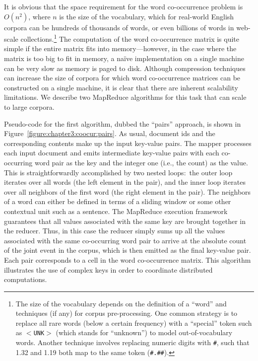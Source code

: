 It is obvious that the space requirement for the word co-occurrence
problem is $O(n^2)$, where $n$ is the size of the vocabulary, which
for real-world English corpora can be hundreds of thousands of words,
or even billions of words in web-scale collections.\footnote{The size
  of the vocabulary depends on the definition of a ``word'' and
  techniques (if any) for corpus pre-processing.  One common strategy
  is to replace all rare words (below a certain frequency) with a
  ``special'' token such as \texttt{$<$UNK$>$} (which stands for
  ``unknown'') to model out-of-vocabulary words.  Another technique
  involves replacing numeric digits with \texttt{\#}, such that 1.32 and
  1.19 both map to the same token (\texttt{\#.\#\#}).}  The computation
of the word co-occurrence matrix is quite simple if the entire matrix
fits into memory---however, in the case where the matrix is too big to
fit in memory, a na\"{i}ve implementation on a single machine can be
very slow as memory is paged to disk.  Although compression techniques
can increase the size of corpora for which word co-occurrence matrices
can be constructed on a single machine, it is clear that there are
inherent scalability limitations.  We describe two MapReduce
algorithms for this task that can scale to large corpora.

Pseudo-code for the first algorithm, dubbed the ``pairs'' approach, is
shown in Figure~\ref{figure:chapter3:coocur:pairs}.  As usual,
document ids and the corresponding contents make up the input
key-value pairs.  The mapper processes each input document and emits
intermediate key-value pairs with each co-occurring word pair as the
key and the integer one (i.e., the count) as the value.  This is
straightforwardly accomplished by two nested loops:\ the outer loop
iterates over all words (the left element in the pair), and the inner
loop iterates over all neighbors of the first word (the right element
in the pair).  The neighbors of a word can either be defined in terms
of a sliding window or some other contextual unit such as a sentence.
The MapReduce execution framework guarantees that all values
associated with the same key are brought together in the reducer.
Thus, in this case the reducer simply sums up all the values
associated with the same co-occurring word pair to arrive at the
absolute count of the joint event in the corpus, which is then emitted
as the final key-value pair. Each pair corresponds to a cell in the
word co-occurrence matrix.  This algorithm illustrates the use of
complex keys in order to coordinate distributed computations.

